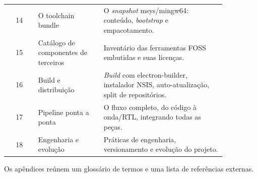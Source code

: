 \begin{longtable}{c >{\raggedright\arraybackslash}p{0.30\linewidth} >{\raggedright\arraybackslash}p{0.56\linewidth}}
14 & O toolchain bundle & O \emph{snapshot} msys/mingw64: conteúdo, \emph{bootstrap} e empacotamento. \\
15 & Catálogo de componentes de terceiros & Inventário das ferramentas FOSS embutidas e suas licenças. \\
16 & Build e distribuição & \emph{Build} com electron-builder, instalador NSIS, auto-atualização, split de repositórios. \\
17 & Pipeline ponta a ponta & O fluxo completo, do código à onda/RTL, integrando todas as peças. \\
18 & Engenharia e evolução & Práticas de engenharia, versionamento e evolução do projeto. \\
\bottomrule
\end{longtable}

\noindent Os apêndices reúnem um glossário de termos e uma lista de referências
externas.
